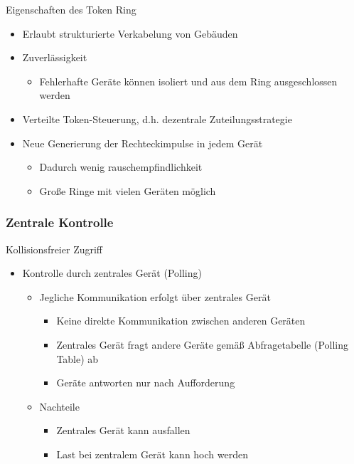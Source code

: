       Eigenschaften des Token Ring
      \begin{itemize}
        \item Erlaubt strukturierte Verkabelung von Gebäuden
        \item Zuverlässigkeit
          \begin{itemize}
            \item Fehlerhafte Geräte können isoliert und aus dem Ring ausgeschlossen werden
          \end{itemize}
        \item Verteilte Token-Steuerung, d.h. dezentrale Zuteilungsstrategie
        \item Neue Generierung der Rechteckimpulse in jedem Gerät
          \begin{itemize}
            \item Dadurch wenig rauschempfindlichkeit
            \item Große Ringe mit vielen Geräten möglich
          \end{itemize}
      \end{itemize}
    \subsubsection{Zentrale Kontrolle}
      Kollisionsfreier Zugriff
      \begin{itemize}
        \item Kontrolle durch zentrales Gerät (Polling)
          \begin{itemize}
            \item Jegliche Kommunikation erfolgt über zentrales Gerät
              \begin{itemize}
                \item Keine direkte Kommunikation zwischen anderen Geräten
                \item Zentrales Gerät fragt andere Geräte gemäß Abfragetabelle (Polling Table) ab
                \item Geräte antworten nur nach Aufforderung
              \end{itemize}
            \item Nachteile
              \begin{itemize}
                \item Zentrales Gerät kann ausfallen
                \item Last bei zentralem Gerät kann hoch werden
              \end{itemize}
          \end{itemize}
      \end{itemize}
